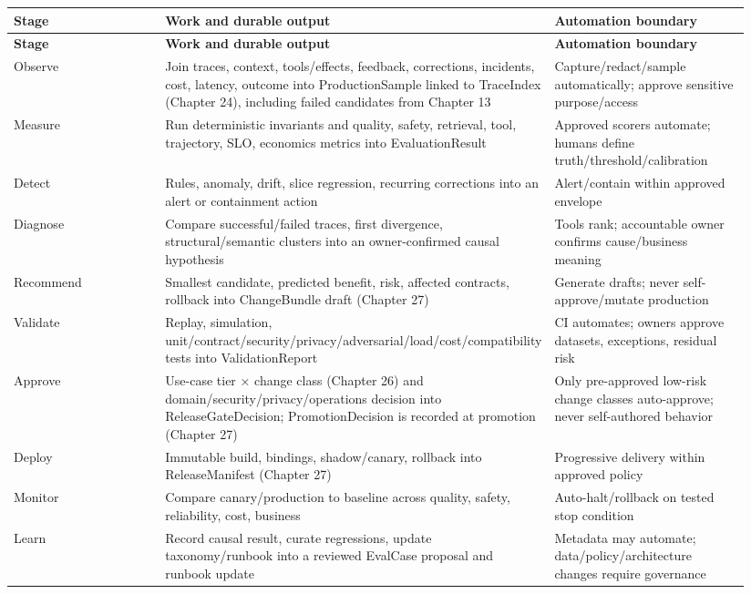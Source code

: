 
\BookTableStart
\small
\begin{longtable}{@{}Y{0.3133\linewidth}Y{0.3133\linewidth}Y{0.3133\linewidth}@{}}
\color{white}\bfseries \textbf{Stage} & \color{white}\bfseries \textbf{Work and durable output} & \color{white}\bfseries \textbf{Automation boundary} \\
\endfirsthead
{}
\color{white}\bfseries \textbf{Stage} & \color{white}\bfseries \textbf{Work and durable output} & \color{white}\bfseries \textbf{Automation boundary} \\
\endhead
Observe & Join traces, context, tools/effects, feedback, corrections, incidents, cost, latency, outcome into ProductionSample linked to TraceIndex (Chapter 24), including failed candidates from Chapter 13 & Capture/redact/sample automatically; approve sensitive purpose/access \\
Measure & Run deterministic invariants and quality, safety, retrieval, tool, trajectory, SLO, economics metrics into EvaluationResult & Approved scorers automate; humans define truth/threshold/calibration \\
Detect & Rules, anomaly, drift, slice regression, recurring corrections into an alert or containment action & Alert/contain within approved envelope \\
Diagnose & Compare successful/failed traces, first divergence, structural/semantic clusters into an owner-confirmed causal hypothesis & Tools rank; accountable owner confirms cause/business meaning \\
Recommend & Smallest candidate, predicted benefit, risk, affected contracts, rollback into ChangeBundle draft (Chapter 27) & Generate drafts; never self-approve/mutate production \\
Validate & Replay, simulation, unit/contract/security/privacy/adversarial/load/cost/compatibility tests into ValidationReport & CI automates; owners approve datasets, exceptions, residual risk \\
Approve & Use-case tier × change class (Chapter 26) and domain/security/privacy/operations decision into ReleaseGateDecision; PromotionDecision is recorded at promotion (Chapter 27) & Only pre-approved low-risk change classes auto-approve; never self-authored behavior \\
Deploy & Immutable build, bindings, shadow/canary, rollback into ReleaseManifest (Chapter 27) & Progressive delivery within approved policy \\
Monitor & Compare canary/production to baseline across quality, safety, reliability, cost, business & Auto-halt/rollback on tested stop condition \\
Learn & Record causal result, curate regressions, update taxonomy/runbook into a reviewed EvalCase proposal and runbook update & Metadata may automate; data/policy/architecture changes require governance \\
\end{longtable}

